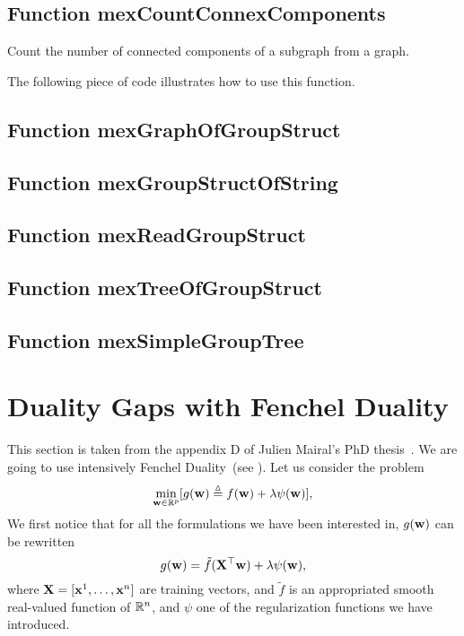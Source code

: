 \documentclass[a4paper, 11pt]{article}
\begin{document}
\subsection{Function mexCountConnexComponents}
Count the number of connected components of a subgraph from a graph.

The following piece of code illustrates how to use this function.


\subsection{Function mexGraphOfGroupStruct}

\subsection{Function mexGroupStructOfString}

\subsection{Function mexReadGroupStruct}

\subsection{Function mexTreeOfGroupStruct}

\subsection{Function mexSimpleGroupTree}


\appendix

\section{Duality Gaps with Fenchel Duality}\label{appendix}
This section is taken from the appendix D of Julien Mairal's PhD thesis~\cite{mairal11}.
We are going to use intensively Fenchel Duality~(see \cite{borwein}).
Let us consider the problem
\begin{equation}
\min_{{\mathbf w} \in {\mathbb R}^p} [g({\mathbf w}) \stackrel{\vartriangle}{=} f({\mathbf w}) + \lambda\psi({\mathbf w})],\label{software:eq:prb}
\end{equation}
We first notice that for all the formulations we have been
interested in, $g({\mathbf w})$ can be rewritten
\begin{equation}
g({\mathbf w}) = \tilde{f}({\mathbf X}^\top{\mathbf w}) + \lambda\psi({\mathbf w}), \label{software:eq:prb2}
\end{equation}
where ${\mathbf X}=[{\mathbf x}^1,\ldots,{\mathbf x}^n]$ are training vectors, and $\tilde{f}$ is an
appropriated smooth real-valued function of ${\mathbb R}^n$,
             and $\psi$ one of the regularization functions we have introduced.
\end{document}
